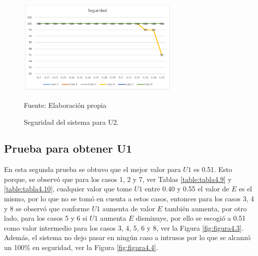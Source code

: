 \begin{figure}[H]
\begin{center}
\includegraphics[width=0.7\textwidth]{Imagenes/Cap4/image002}
\end{center}
\begin{center}
\vskip -0.5cm
\caption{\small{Seguridad del sistema para U2.}}
\label{fig:figura4.2}
{\small{Fuente: Elaboración propia}}
\end{center}
\end{figure}

\subsection{Prueba para obtener U1}
\par
En esta segunda prueba se obtuvo que el mejor valor para $U1$ es 0.51. Esto porque, se observó que para los casos 1, 2 y 7, ver Tablas \ref{table:tabla4.9} y \ref{table:tabla4.10}, cualquier valor que tome $U1$ entre 0.40 y 0.55 el valor de $E$ es el mismo, por lo que no se tomó en cuenta a estos casos, entonces para los casos 3, 4 y 8 se observó que conforme $U1$ aumenta de valor $E$ también aumenta, por otro lado, para los casos 5 y 6 si $U1$ aumenta $E$ disminuye, por ello se escogió a 0.51 como valor intermedio para los casos 3, 4, 5, 6 y 8, ver la Figura \ref{fig:figura4.3}. Además, el sistema no dejo pasar en ningún caso a intrusos por lo que se alcanzó un 100\% en seguridad, ver la Figura \ref{fig:figura4.4}.

